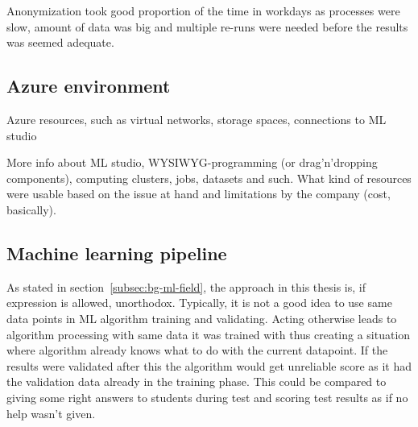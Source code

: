 Anonymization took good proportion of the time in workdays
as processes were slow,
amount of data was big
and multiple re-runs were needed
before the results was seemed adequate.


\subsection{Azure environment}\label{subsec:meth-azure-environment}

Azure resources, such as virtual networks, storage spaces, connections to ML studio \etc

More info about ML studio, WYSIWYG-programming (or drag'n'dropping components),
computing clusters, jobs, datasets and such.
What kind of resources were usable based on the issue at hand
and limitations by the company (cost, basically).





\subsection{Machine learning pipeline}\label{subsec:meth-ml-pipeline}

As stated in section~\ref{subsec:bg-ml-field},
the approach in this thesis is,
if expression is allowed, unorthodox.
Typically,
it is not a good idea to use
same data points in ML algorithm training and validating.
Acting otherwise
leads to algorithm processing with
same data it was trained with
thus creating a situation
where algorithm already knows what to do with the current datapoint.
If the results were validated after this
the algorithm would get unreliable score
as it had the validation data already in the training phase.
This could be compared to
giving some right answers to students
during test and scoring test results as if
no help wasn't given.



